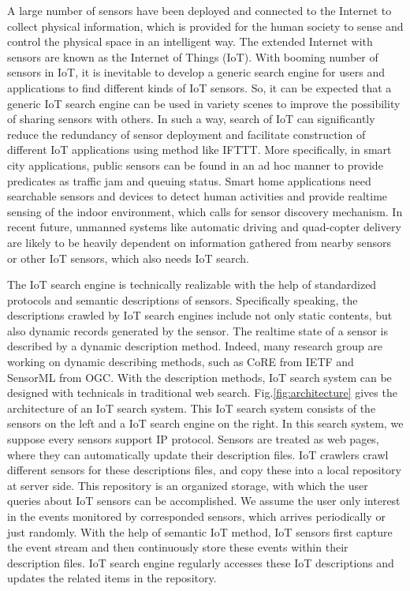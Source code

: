 \documentclass[conference]{IEEEtran}
\begin{document}
A large number of sensors have been deployed and connected to the Internet to collect physical information, which is provided for the human society to sense and control the physical space in an intelligent way. 
The extended Internet with sensors are known as the Internet of Things (IoT). 
With booming number of sensors in IoT, it is inevitable to develop a generic search engine for users and applications to find different kinds of IoT sensors. 
So, it can be expected that a generic IoT search engine can be used in variety scenes to improve the possibility of sharing sensors with others.
In such a way, search of IoT can significantly reduce the redundancy of sensor deployment and facilitate construction of different IoT applications using method like IFTTT\cite{ifttt}.
More specifically, in smart city applications, public sensors can be found in an ad hoc manner to provide predicates as traffic jam and queuing status. 
Smart home applications need searchable sensors and devices to detect human activities and provide realtime sensing of the indoor environment, which calls for sensor discovery mechanism. 
In recent future, unmanned systems like automatic driving and quad-copter delivery are likely to be heavily dependent on information gathered from nearby sensors or other IoT sensors, which also needs IoT search. 

The IoT search engine is technically realizable with the help of standardized protocols and semantic descriptions of sensors\cite{Pfisterer2011}. 
Specifically speaking, the descriptions crawled by IoT search engines include not only static contents, but also dynamic records generated by the sensor. The realtime state of a sensor is described by a dynamic description method.
Indeed, many research group are working on dynamic describing methods, such as CoRE\cite{CoREWorkingGroup2012} from IETF and SensorML\cite{botts2007opengis} from OGC. 
With the description methods, IoT search system can be designed with technicals in traditional web search.
Fig.\ref{fig:architecture} gives the architecture of an IoT search system.
This IoT search system consists of the sensors on the left and a IoT search engine on the right.
In this search system, we suppose every sensors support IP protocol.
Sensors are treated as web pages, where they can automatically update their description files.
IoT crawlers crawl different sensors for these descriptions files, and copy these into a local repository at server side. This repository is an organized storage, with which the user queries about IoT sensors can be accomplished.
We assume the user only interest in the events monitored by corresponded sensors, which arrives periodically or just randomly. 
With the help of semantic IoT method, IoT sensors first capture the event stream and then continuously store these events within their description files. 
IoT search engine regularly accesses these IoT descriptions and updates the related items in the repository. 
\end{document}
